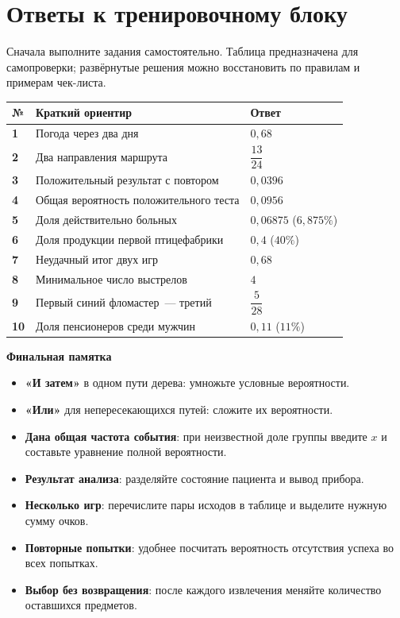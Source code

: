 \documentclass[a4paper,12pt]{article}
\newcommand{\smalltopic}[1]{\par\vspace{7pt}\noindent\textcolor{darkaccent}{\bfseries #1}\par\vspace{1pt}}
\begin{document}
\section*{Ответы к тренировочному блоку}
\textcolor{muted}{Сначала выполните задания самостоятельно. Таблица предназначена для самопроверки; развёрнутые решения можно восстановить по правилам и примерам чек-листа.}
\vspace{6mm}
\begin{center}
\renewcommand{\arraystretch}{1.65}
\begin{tabularx}{\linewidth}{@{}>{\bfseries}p{13mm}X>{\raggedleft\arraybackslash}p{42mm}@{}}
\toprule
№ & Краткий ориентир & Ответ\\
\midrule
1 & Погода через два дня & $0{,}68$\\
2 & Два направления маршрута & $\dfrac{13}{24}$\\
3 & Положительный результат с повтором & $0{,}0396$\\
4 & Общая вероятность положительного теста & $0{,}0956$\\
5 & Доля действительно больных & $0{,}06875$ ($6{,}875\%$)\\
6 & Доля продукции первой птицефабрики & $0{,}4$ ($40\%$)\\
7 & Неудачный итог двух игр & $0{,}68$\\
8 & Минимальное число выстрелов & $4$\\
9 & Первый синий фломастер~--- третий & $\dfrac{5}{28}$\\
10 & Доля пенсионеров среди мужчин & $0{,}11$ ($11\%$)\\
\bottomrule
\end{tabularx}
\end{center}
\vspace{10mm}
\smalltopic{Финальная памятка}
\begin{itemize}
\item \textbf{«И затем»} в одном пути дерева: умножьте условные вероятности.
\item \textbf{«Или»} для непересекающихся путей: сложите их вероятности.
\item \textbf{Дана общая частота события}: при неизвестной доле группы введите $x$ и составьте уравнение полной вероятности.
\item \textbf{Результат анализа}: разделяйте состояние пациента и вывод прибора.
\item \textbf{Несколько игр}: перечислите пары исходов в таблице и выделите нужную сумму очков.
\item \textbf{Повторные попытки}: удобнее посчитать вероятность отсутствия успеха во всех попытках.
\item \textbf{Выбор без возвращения}: после каждого извлечения меняйте количество оставшихся предметов.
\end{itemize}
\end{document}
